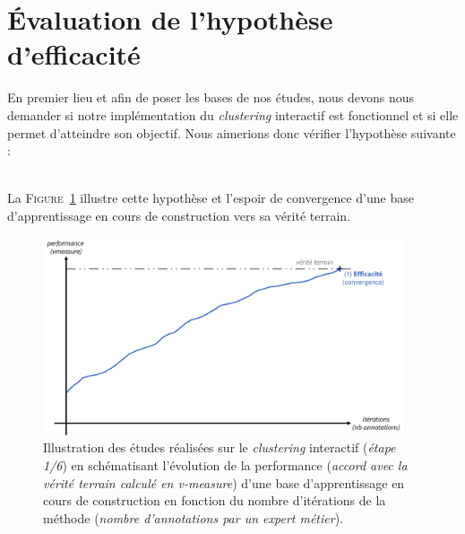 \section{Évaluation de l'hypothèse d'efficacité}
\label{section:4.1-HYPOTHESE-EFFICACITE}

	En premier lieu et afin de poser les bases de nos études, nous devons nous demander si notre implémentation du \textit{clustering} interactif est fonctionnel et si elle permet d'atteindre son objectif.
	Nous aimerions donc vérifier l'hypothèse suivante :
	
	\begin{tcolorbox}[
		title=\faVial~\textbf{Hypothèse d'efficacité}~\faVial,
		colback=colorTcolorboxHypothesis!15,
		colframe=colorTcolorboxHypothesis!75,
		width=\linewidth
	]
		 \\
		
		La \textsc{Figure~\ref{figure:4.1-HYPOTHESE-EFFICACITE}} illustre cette hypothèse et l'espoir de convergence d'une base d'apprentissage en cours de construction vers sa vérité terrain.
		\begin{figure}[H]  %
			\centering
			\includegraphics[width=0.95\textwidth]{figures/hypotheses-01-efficacite}
			\caption{
				Illustration des études réalisées sur le \textit{clustering} interactif (\textit{étape 1/6}) en schématisant l'évolution de la performance (\textit{accord avec la vérité terrain calculé en v-measure}) d'une base d'apprentissage en cours de construction en fonction du nombre d'itérations de la méthode (\textit{nombre d'annotations par un expert métier}).
			}
			\label{figure:4.1-HYPOTHESE-EFFICACITE}
		\end{figure}
	\end{tcolorbox}
		

